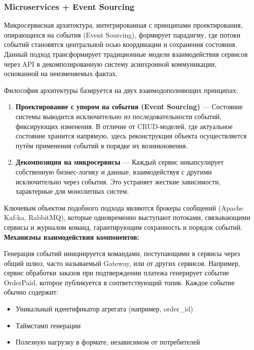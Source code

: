         \subsubsection{Microservices + Event Sourcing}
            Микросервисная архитектура, интегрированная с принципами проектирования, опирающихся на события (Event Sourcing), формирует парадигму, где потоки событий становятся центральной осью координации и сохранения состояния. Данный подход трансформирует традиционные модели взаимодействия сервисов через API в декомпозированную систему асинхронной коммуникации, основанной на неизменяемых фактах.
            
            
            Философия архитектуры базируется на двух взаимодополняющих принципах:
            \begin{enumerate}
                \item \textbf{Проектирование с упором на события (Event Sourcing)} — Состояние системы выводится исключительно из последовательности событий, фиксирующих изменения. В отличие от CRUD-моделей, где актуальное состояние хранится напрямую, здесь реконструкция объекта осуществляется путём применения событий в порядке их возникновения.
                \item \textbf{Декомпозиция на микросервисы} — Каждый сервис инкапсулирует собственную бизнес-логику и данные, взаимодействуя с другими исключительно через события. Это устраняет жесткие зависимости, характерные для монолитных систем.
            \end{enumerate}

            
            Ключевым объектом подобного подхода являются брокеры сообщений (Apache Kaf-ka, RabbitMQ), которые одновременно выступают потоками, связывающими сервисы и журналом команд, гарантирующим сохранность и порядок событий.\\

            \textbf{Механизмы взаимодействия компонентов:}
            
            Генерация событий инициируется командами, поступающими в сервисы через общий шлюз, часто называемый Gateway, или от других сервисов. Например, сервис обработки заказов при подтверждении платежа генерирует событие OrderPaid, которое публикуется в соответствующий топик. Каждое событие обычно содержит:
            \begin{itemize}
                \item Уникальный идентификатор агрегата (например, order\_id)
                \item Таймстамп генерации
                \item Полезную нагрузку в формате, независимом от потребителей
            \end{itemize}

